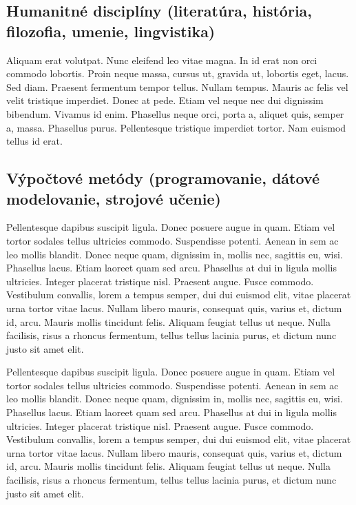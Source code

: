 \documentclass[
  titlepage,
  openright,
  DIV=calc,
  toc=listof,
  listof=nochaptergap]{scrbook}
\begin{document}
\subsection{Humanitné disciplíny (literatúra, história, filozofia,
umenie,
lingvistika)}\label{humanitnuxe9-discipluxedny-literatuxfara-histuxf3ria-filozofia-umenie-lingvistika}

Aliquam erat volutpat. Nunc eleifend leo vitae magna. In id erat non
orci commodo lobortis. Proin neque massa, cursus ut, gravida ut,
lobortis eget, lacus. Sed diam. Praesent fermentum tempor tellus. Nullam
tempus. Mauris ac felis vel velit tristique imperdiet. Donec at pede.
Etiam vel neque nec dui dignissim bibendum. Vivamus id enim. Phasellus
neque orci, porta a, aliquet quis, semper a, massa. Phasellus purus.
Pellentesque tristique imperdiet tortor. Nam euismod tellus id erat.

\subsection{Výpočtové metódy (programovanie, dátové modelovanie,
strojové
učenie)}\label{vuxfdpoux10dtovuxe9-metuxf3dy-programovanie-duxe1tovuxe9-modelovanie-strojovuxe9-uux10denie}

Pellentesque dapibus suscipit ligula. Donec posuere augue in quam. Etiam
vel tortor sodales tellus ultricies commodo. Suspendisse potenti. Aenean
in sem ac leo mollis blandit. Donec neque quam, dignissim in, mollis
nec, sagittis eu, wisi. Phasellus lacus. Etiam laoreet quam sed arcu.
Phasellus at dui in ligula mollis ultricies. Integer placerat tristique
nisl. Praesent augue. Fusce commodo. Vestibulum convallis, lorem a
tempus semper, dui dui euismod elit, vitae placerat urna tortor vitae
lacus. Nullam libero mauris, consequat quis, varius et, dictum id, arcu.
Mauris mollis tincidunt felis. Aliquam feugiat tellus ut neque. Nulla
facilisis, risus a rhoncus fermentum, tellus tellus lacinia purus, et
dictum nunc justo sit amet elit.

Pellentesque dapibus suscipit ligula. Donec posuere augue in quam. Etiam
vel tortor sodales tellus ultricies commodo. Suspendisse potenti. Aenean
in sem ac leo mollis blandit. Donec neque quam, dignissim in, mollis
nec, sagittis eu, wisi. Phasellus lacus. Etiam laoreet quam sed arcu.
Phasellus at dui in ligula mollis ultricies. Integer placerat tristique
nisl. Praesent augue. Fusce commodo. Vestibulum convallis, lorem a
tempus semper, dui dui euismod elit, vitae placerat urna tortor vitae
lacus. Nullam libero mauris, consequat quis, varius et, dictum id, arcu.
Mauris mollis tincidunt felis. Aliquam feugiat tellus ut neque. Nulla
facilisis, risus a rhoncus fermentum, tellus tellus lacinia purus, et
dictum nunc justo sit amet elit.
\end{document}
